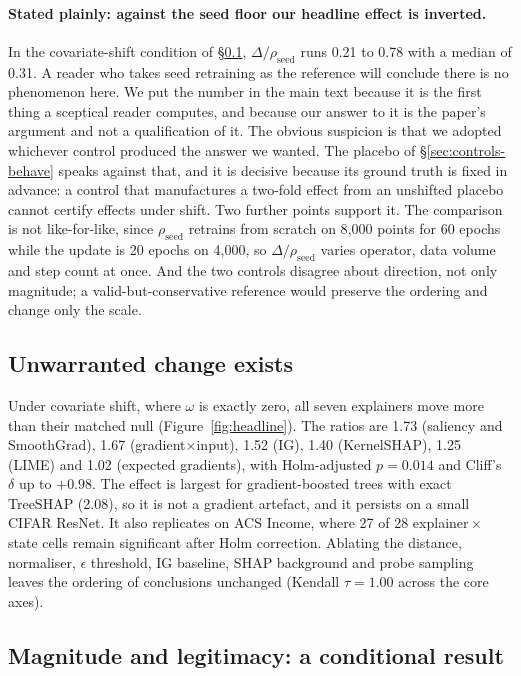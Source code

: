 \documentclass{article}
\newcommand{\rseed}{\rho_{\mathrm{seed}}}
\begin{document}
\paragraph{Stated plainly: against the seed floor our headline effect is inverted.} In the
covariate-shift condition of \S\ref{sec:h1}, $\Delta/\rseed$ runs 0.21 to 0.78 with a median of 0.31.
A reader who takes seed retraining as the reference will conclude there is no phenomenon here. We put
the number in the main text because it is the first thing a sceptical reader computes, and because
our answer to it is the paper's argument and not a qualification of it. The obvious suspicion is
that we adopted whichever control produced the answer we wanted. The placebo of
\S\ref{sec:controls-behave} speaks against that, and it is decisive because its ground truth is fixed
in advance: a control that manufactures a two-fold effect from an unshifted placebo cannot certify
effects under shift. Two further points support it. The comparison is not like-for-like, since
$\rseed$ retrains from scratch on 8{,}000 points for 60 epochs while the update is 20 epochs on
4{,}000, so $\Delta/\rseed$ varies operator, data volume and step count at once. And the two controls
disagree about direction, not only magnitude; a valid-but-conservative reference would preserve the
ordering and change only the scale.

\subsection{Unwarranted change exists}
\label{sec:h1}

Under covariate shift, where $\omega$ is exactly zero, all seven explainers move more than their
matched null (Figure~\ref{fig:headline}). The ratios are 1.73 (saliency and SmoothGrad), 1.67
(gradient$\times$input), 1.52 (IG), 1.40 (KernelSHAP), 1.25 (LIME) and 1.02 (expected gradients),
with Holm-adjusted $p=0.014$ and Cliff's $\delta$ up to $+0.98$. The effect is largest for
gradient-boosted trees with exact TreeSHAP (2.08), so it is not a gradient artefact, and it persists
on a small CIFAR ResNet. It also replicates on ACS Income, where 27 of 28 explainer\,$\times$\,state
cells remain significant after Holm correction. Ablating the distance, normaliser, $\epsilon$
threshold, IG baseline, SHAP background and probe sampling leaves the ordering of conclusions
unchanged (Kendall $\tau=1.00$ across the core axes).

\subsection{Magnitude and legitimacy: a conditional result}
\label{sec:h2}
\end{document}
